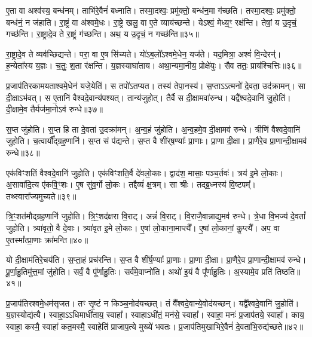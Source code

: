 ए॒ता वा अश्व॑स्य॒ बन्ध॑नम्।
ताभि॑रे॒वैनं॑ बध्नाति।
तस्मा॒दश्वः॒ प्रमु॑क्तो॒ बन्ध॑न॒मा ग॑च्छति।
तस्मा॒दश्वः॒ प्रमु॑क्तो॒ बन्ध॑नं॒ न ज॑हाति।
रा॒ष्ट्रं वा अ॑श्वमे॒धः।
रा॒ष्ट्रे खलु॒ वा ए॒ते व्याय॑च्छन्ते।
येऽश्वं॒ मेध्य॒ꣳ॒ रक्ष॑न्ति।
तेषां॒ य उ॒दृचं॒ गच्छ॑न्ति।
रा॒ष्ट्रादे॒व ते रा॒ष्ट्रं ग॑च्छन्ति।
अथ॒ य उ॒दृचं॒ न गच्छ॑न्ति॥३५॥\ip

रा॒ष्ट्रादे॒व ते व्यव॑च्छिद्यन्ते।
परा॒ वा ए॒ष सि॑च्यते।
यो॑ऽब॒लो᳚\-ऽश्वमे॒धेन॒ यज॑ते।
यद॒मित्रा॒ अश्वं॑ वि॒न्देरन्॑।
ह॒न्येता᳚स्य य॒ज्ञः।
च॒तुः॒ श॒ता र॑क्षन्ति।
य॒ज्ञस्याघा॑ताय।
अथा॒न्यमा॒नीय॒ प्रोक्षे॑युः।
सैव ततः॒ प्राय॑श्चित्तिः॥३६॥\ip\anuvakamend[ग॒च्छ॒ति॒ भ॒व॒तः॒ प॒थ्सु जु॑होति॒ न गच्छ॑न्ति॒ नव॑ च]

प्र॒जा\-प॑तिरकामयताश्वमे॒धेन॑ यजे॒येति॑।
स तपो॑\-ऽतप्यत।
तस्य॑ तेपा॒नस्य॑।
स॒प्ताऽऽत्मनो॑ दे॒वता॒ उद॑क्रामन्।
सा दी॒क्षा\-ऽभ॑वत्।
स ए॒तानि॑ वैश्वदे॒वान्य॑पश्यत्।
तान्य॑जुहोत्।
तैर्वै स दी॒क्षामवा॑रुन्ध।
यद्वै᳚श्वदे॒वानि॑ जु॒होति॑।
दी॒क्षामे॒व तैर्यज॑मा॒नोऽव॑ रुन्धे॥३७॥\ip

स॒प्त जु॑होति।
स॒प्त हि ता दे॒वता॑ उ॒दक्रा॑मन्।
अ॒न्व॒हं जु॑होति।
अ॒न्व॒हमे॒व दी॒क्षामव॑ रुन्धे।
त्रीणि॑ वैश्वदे॒वानि॑ जुहोति।
च॒त्वार्यौ᳚द्ग्रह॒णानि॑।
स॒प्त सं प॑द्यन्ते।
स॒प्त वै शी॑र्‌\mbox{}ष॒ण्याः᳚ प्रा॒णाः।
प्रा॒णा दी॒क्षा।
प्रा॒णैरे॒व प्रा॒णान्दी॒क्षामव॑ रुन्धे॥३८॥\ip

एक॑विꣳशतिं वैश्वदे॒वानि॑ जुहोति।
एक॑विꣳशति॒र्वै दे॑वलो॒काः।
द्वाद॑श॒ मासाः॒ पञ्च॒र्तवः॑।
त्रय॑ इ॒मे लो॒काः।
अ॒सावा॑दि॒त्य ए॑कवि॒ꣳ॒शः।
ए॒ष सु॑व॒र्गो लो॒कः।
तद्दैव्यं॑ क्ष॒त्रम्।
सा श्रीः।
तद्ब्र॒ध्नस्य॑ वि॒ष्टपम्᳚।
तथ्स्वारा᳚ज्यमुच्यते॥३९॥\ip

त्रि॒ꣳ॒शत॑मौद्ग्रह॒णानि॑ जुहोति।
त्रि॒ꣳ॒शद॑क्षरा वि॒राट्।
अन्नं॑ वि॒राट्।
वि॒राजै॒वान्नाद्य॒मव॑ रुन्धे।
त्रे॒धा वि॒भज्य॑ दे॒वतां᳚ जुहोति।
त्र्या॑वृतो॒ वै दे॒वाः।
त्र्या॑वृत इ॒मे लो॒काः।
ए॒षां लो॒काना॒माप्त्यै᳚।
ए॒षां लो॒कानां॒ कॢप्त्यै᳚।
अप॒ वा ए॒तस्मा᳚त्प्रा॒णाः क्रा॑मन्ति॥४०॥\ip

यो दी॒क्षाम॑तिरे॒चय॑ति।
स॒प्ता॒हं प्रच॑रन्ति।
स॒प्त वै शी॑र्\mbox{}ष॒ण्याः᳚ प्रा॒णाः।
प्रा॒णा दी॒क्षा।
प्रा॒णैरे॒व प्रा॒णान्दी॒क्षामव॑ रुन्धे।
पू॒र्णा॒हु॒तिमु॑त्त॒मां जु॑होति।
सर्वं॒ वै पू᳚र्णाहु॒तिः।
सर्व॑\-मे॒वा\-प्नो॑ति।
अथो॑ इ॒यं वै पू᳚र्णाहु॒तिः।
अ॒स्यामे॒व प्रति॑ तिष्ठति॥४१॥\ip\anuvakamend[रु॒न्धे॒ प्रा॒णान्दी॒क्षामव॑ रुन्ध उच्यते क्रामन्ति तिष्ठति]

प्र॒जा\-प॑तिरश्वमे॒धम॑\-सृजत।
तꣳ सृ॒ष्टं न किञ्च॒नोद॑यच्छत्।
तं वै᳚श्वदे॒वान्ये॒वोद॑यच्छन्।
यद्वै᳚श्वदे॒वानि॑ जु॒होति॑।
य॒ज्ञस्योद्य॑त्यै।
स्वाहा॒\-ऽऽधिमाधी॑ताय॒ स्वाहा᳚।
स्वाहा\-ऽधी॑तं॒ मन॑से॒ स्वाहा᳚।
स्वाहा॒ मनः॑ प्र॒जा\-प॑तये॒ स्वाहा᳚।
काय॒ स्वाहा॒ कस्मै॒ स्वाहा॑ कत॒मस्मै॒ स्वाहेति॑ प्राजाप॒त्ये मुख्ये॑ भवतः।
प्र॒जा\-प॑तिमुखाभिरे॒वैनं॑ दे॒वता॑भि॒रुद्य॑च्छते॥४२॥\ip


